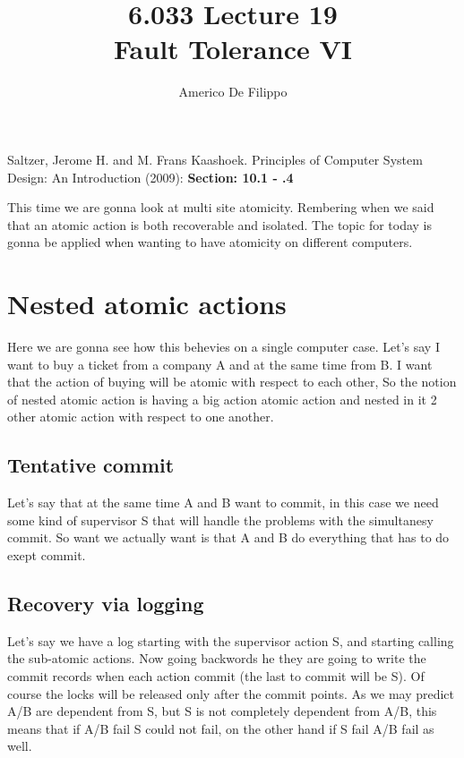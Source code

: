 \documentclass{article}
\title{6.033 Lecture 19 \\ Fault Tolerance VI}
\author{Americo De Filippo}
\begin{document}
 
  \maketitle
  \begin{thebibliography}{9}
    Saltzer, Jerome H. and M. Frans Kaashoek. Principles of Computer System Design: An Introduction (2009): \textbf{Section: 10.1 - .4}
  \end{thebibliography}
  \maketitle
  This time we are gonna look at multi site atomicity. Rembering when we said that an atomic
  action is both recoverable and isolated. The topic for today is gonna be applied when 
  wanting to have atomicity on different computers.
  \section{Nested atomic actions}
    Here we are gonna see how this behevies on a single computer case.
    Let's say I want to buy a ticket from a company A and at the same time from B. 
    I want that the action of buying will be atomic with respect to each other, 
    So the notion of nested atomic action is having a big action atomic action and nested in it
    2 other atomic action with respect to one another. 
    \subsection{Tentative commit}
      Let's say that at the same time A and B want to commit, in this case we need some kind
      of supervisor S that will handle the problems with the simultanesy commit. So want 
      we actually want is that A and B do everything that has to do exept commit. 
    \subsection{Recovery via logging}
      Let's say we have a log starting with the supervisor action S, and starting calling 
      the sub-atomic actions. Now going backwords he they are going to write the commit 
      records when each action commit (the last to commit will be S). Of course the locks
      will be released only after the commit points. As we may predict A/B are dependent from
      S, but S is not completely dependent from A/B, this means that if A/B fail S could not 
      fail, on the other hand if S fail A/B fail as well.
\end{document}
